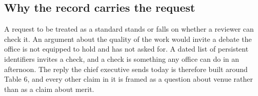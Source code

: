 \subsection{Why the record carries the request}

A request to be treated as a standard stands or falls on whether a reviewer can
check it. An argument about the quality of the work would invite a debate the
office is not equipped to hold and has not asked for. A dated list of persistent
identifiers invites a check, and a check is something any office can do in an
afternoon. The reply the chief executive sends today is therefore built around
Table 6, and every other claim in it is framed as a question about venue rather
than as a claim about merit.
